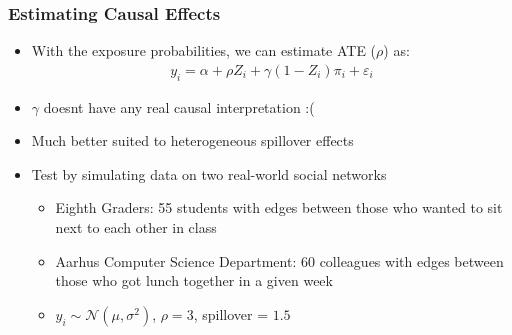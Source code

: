 \documentclass[
	11pt, %
]{beamer}
\begin{document}
\begin{frame}
	\frametitle{Estimating Causal Effects}
	\begin{itemize}
		\setlength\itemsep{1em}
		\item With the exposure probabilities, we can estimate ATE ($\rho$) as: \begin{align*}
			y_i = \alpha + \rho Z_i + \gamma (1 - Z_i) \pi_i + \varepsilon_i 
		\end{align*}
		\item $\gamma$ doesnt have any real causal interpretation :(
		\item Much better suited to heterogeneous spillover effects 
		\item Test by simulating data on two real-world social networks \\[0.5ex]
		\begin{itemize}
		\setlength\itemsep{0.5em}
			\item Eighth Graders: 55 students with edges between those who wanted to sit next to each other in class 
			\item Aarhus Computer Science Department: 60 colleagues with edges between those who got lunch together in a given week 
			\item $y_i \sim \mathcal{N}(\mu, \sigma^2)$, $\rho = 3$, spillover = $1.5$
		\end{itemize}
	\end{itemize}
\end{frame}
\end{document}
